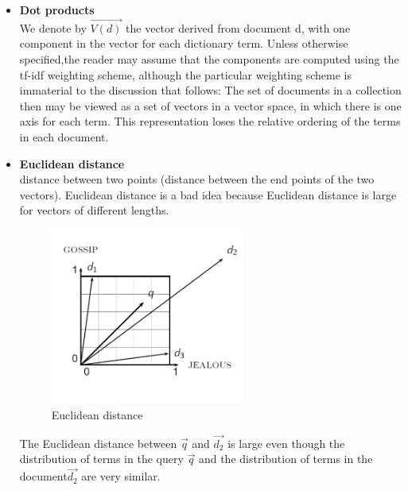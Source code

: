 \begin{itemize}
     \item \textbf{Dot products}\\
     We denote by $\vec{V(d)}$ the vector derived from document d, with one component in the vector for each dictionary term. Unless otherwise specified,the reader may assume that the components are computed using the tf-idf weighting scheme, although the particular weighting scheme is immaterial to the discussion that follows: 
     The set of documents in a collection then may be viewed as a set of vectors in a vector space, in which there is one axis for each term.              This representation loses the relative ordering of the terms in each document.
      
     
\end{itemize}

\begin{itemize}
     \item \textbf{Euclidean distance}\\
     distance between two points (distance between the end points of the two vectors). 
     Euclidean distance is a bad idea because Euclidean distance is large for vectors of different lengths.
     
     
\begin{figure}[H]%
    \center%
    \includegraphics[width=0.6\textwidth]{images/shimaa/Euclidean distance.png}
    \caption[ Euclidean distance]{Euclidean distance}\label{fig:Euclidean distance}%
   \end{figure}

   The Euclidean distance between $\vec{q}$ and $\vec{d_2}$  is large even though the distribution of terms in the query $\vec{q}$ and the distribution of terms in the document$\vec{d_2}$ are very similar.  
  
\end{itemize}   

